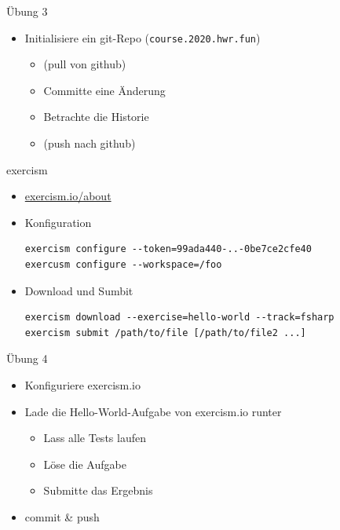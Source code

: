 \documentclass[t]{beamer}
\begin{document}
\begin{frame}[label={sec:org1193f25},fragile]{Übung 3}
 \begin{itemize}
\item Initialisiere ein git-Repo (\texttt{course.2020.hwr.fun})
\begin{itemize}
\item (pull von github)
\item Committe eine Änderung
\item Betrachte die Historie
\item (push nach github)
\end{itemize}
\end{itemize}
\end{frame}

\begin{frame}[label={sec:orgfb44d16},fragile]{exercism}
 \begin{itemize}
\item \href{https://exercism.io/about}{exercism.io/about}
\item Konfiguration
\begin{verbatim}
exercism configure --token=99ada440-..-0be7ce2cfe40
exercusm configure --workspace=/foo
\end{verbatim}
\item Download und Sumbit
\begin{verbatim}
exercism download --exercise=hello-world --track=fsharp
exercism submit /path/to/file [/path/to/file2 ...]
\end{verbatim}
\end{itemize}
\end{frame}

\begin{frame}[label={sec:orgc5b50c3}]{Übung 4}
\begin{itemize}
\item Konfiguriere exercism.io
\item Lade die Hello-World-Aufgabe von exercism.io runter
\begin{itemize}
\item Lass alle Tests laufen
\item Löse die Aufgabe
\item Submitte das Ergebnis
\end{itemize}
\item commit \& push
\end{itemize}
\end{frame}
\end{document}
